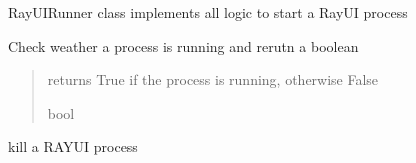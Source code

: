 \documentclass[letterpaper,10pt,english]{sphinxmanual}
\begin{document}
\begin{fulllineitems}
\label{\detokenize{code_documentation:raypyng.runner.RayUIRunner}}
\pysigstartsignatures
{}
\pysigstopsignatures
\sphinxAtStartPar
RayUIRunner class implements all logic to start a RayUI process

\begin{fulllineitems}
\label{\detokenize{code_documentation:raypyng.runner.RayUIRunner.isrunning}}
\pysigstartsignatures
{}
\pysigstopsignatures
\sphinxAtStartPar
Check weather a process is running and rerutn a boolean
\begin{quote}\begin{description}
\sphinxAtStartPar
returns True if the process is running, otherwise False

\sphinxAtStartPar
bool

\end{description}\end{quote}

\end{fulllineitems}


\begin{fulllineitems}
\label{\detokenize{code_documentation:raypyng.runner.RayUIRunner.kill}}
\pysigstartsignatures
{}
\pysigstopsignatures
\sphinxAtStartPar
kill a RAY\sphinxhyphen{}UI process

\end{fulllineitems}



\end{fulllineitems}
\end{document}
